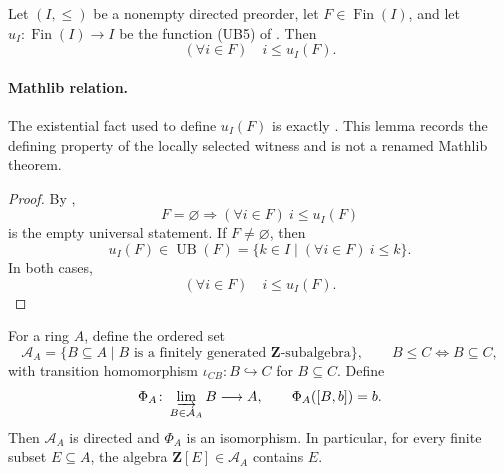 \begin{lemma}
  \label{lemma:nagata-directed-finite-upper-bound}
  \lean{}

  Let \((I,\leq)\) be a nonempty directed preorder, let
  \(F\in\operatorname{Fin}(I)\), and let
  \(u_I\colon\operatorname{Fin}(I)\to I\) be the function (UB5) of
  .  Then
  \[
    (\forall i\in F)\quad i\leq u_I(F).
  \]

  \paragraph{Mathlib relation.}
  The existential fact used to define $u_I(F)$ is exactly
  \texttt{}.  This lemma records the defining
  property of the locally selected witness and is not a renamed Mathlib
  theorem.
\end{lemma}

\begin{proof}
  By ,
  \[
    F=\varnothing\Longrightarrow
      (\forall i\in F)\ i\leq u_I(F)
  \]
  is the empty universal statement.  If $F\neq\varnothing$, then
  \[
    u_I(F)\in\operatorname{UB}(F)
      =\{k\in I\mid(\forall i\in F)\ i\leq k\}.
  \]
  In both cases,
  \[
    (\forall i\in F)\quad i\leq u_I(F).
  \]
\end{proof}

\begin{lemma}
  \label{lemma:nagata-ring-finite-type-subalgebras}
  \lean{}

  For a ring $A$, define the ordered set
  \[
    \mathcal A_A
      =\{B\subseteq A\mid B\text{ is a finitely generated }
        \mathbf Z\text{-subalgebra}\},
    \qquad
    B\leq C\Longleftrightarrow B\subseteq C,
  \]
  with transition homomorphism
  $\iota_{CB}\colon B\hookrightarrow C$ for $B\subseteq C$.  Define
  \[
    \Phi_A\colon\varinjlim_{B\in\mathcal A_A}B\longrightarrow A,
    \qquad
    \Phi_A([B,b])=b.
  \]
  Then $\mathcal A_A$ is directed and $\Phi_A$ is an isomorphism.  In
  particular, for every finite subset $E\subseteq A$, the algebra
  $\mathbf Z[E]\in\mathcal A_A$ contains $E$.
\end{lemma}

